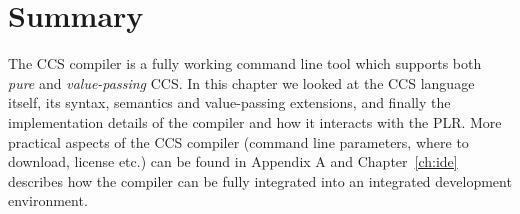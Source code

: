\section{Summary}
	
	The CCS compiler is a fully working command line tool which supports both 
	\textit{pure} and \textit{value-passing} CCS. In this chapter we looked at 
	the CCS language itself, its syntax, semantics and value-passing extensions, 
	and finally the implementation details of the compiler and how it interacts 
	with the PLR.	More practical aspects of the CCS compiler (command line 
	parameters, where to download, license etc.) can be found in Appendix A and 
	Chapter~\ref{ch:ide} describes how the compiler can be fully integrated into 
	an integrated development environment.